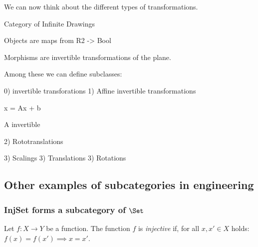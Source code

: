 
We can now think about the different types of transformations. 



Category of Infinite Drawings

Objects are maps from R2 -> Bool 

Morphisms are invertible transformations of the plane. 

Among these we can define subclasses:

0) invertible transforations
1) Affine invertible transformations 

x = Ax + b

A invertible

2) Rototranslations

3) Scalings 
3) Translations
3) Rotations




\subsection{Other examples of subcategories in engineering}






\subsubsection{InjSet forms a subcategory of $\Set$}
\begin{definition}\label{def:injective-function}
Let $f\colon X\to Y$ be a function. The function $f$ is \emph{injective} if, for all $x,x'\in X$ holds: $f(x)=f(x')\implies x=x'$.
\end{definition}

